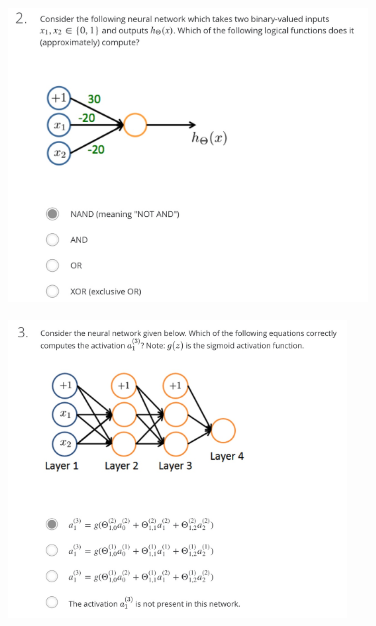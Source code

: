 \documentclass[12pt, A4,onecolumn]{article} %
\begin{document}
\begin{figure}[H]
	\centering
	\includegraphics[width=0.85\textwidth]{./ImagenesW4/testNN2}
\end{figure}

\begin{figure}[H]
	\centering
	\includegraphics[width=0.8\textwidth]{./ImagenesW4/testNN3}
\end{figure}
\end{document}

